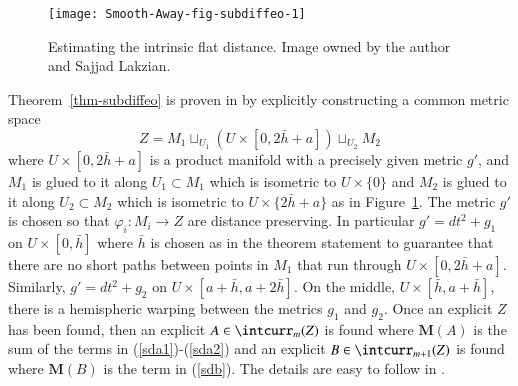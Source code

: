 \documentclass[12pt]{amsart}
\begin{document}
\begin{figure}[htbp]
\begin{center}
\texttt{[image: Smooth-Away-fig-subdiffeo-1]}
\caption{Estimating the intrinsic flat distance.    Image owned by the author
and Sajjad Lakzian.}
\label{fig-LS}
\end{center}
\end{figure}

Theorem~\ref{thm-subdiffeo} is proven in \cite{Lakzian-Sormani}
by explicitly constructing a 
common metric space 
\begin{equation}
Z = M_1{\sqcup}_{U_1}(U\times [0,2\bar{h}+a] ) {\sqcup}_{U_2}M_2
\end{equation}
where $U\times [0,2\bar{h}+a]$ is a product manifold with a precisely given
metric $g'$, and
$M_1$ is glued to it along $U_1\subset M_1$ which is
isometric to $U \times\{0\}$
and  $M_2$ is glued to it along $U_2\subset M_2$ which is
isometric to $U \times\{2\bar{h}+a\}$ as in Figure~\ref{fig-LS}.
The metric $g'$ is chosen so that $\varphi_i: M_i \to Z$
are distance preserving.  In particular $g'=dt^2+ g_1$ on
$U\times [0,\bar{h}]$ where $\bar{h}$ is chosen as in the theorem
statement to guarantee that there are no
short paths between points in $M_1$ that run through $U\times [0,2\bar{h}+a]$.
Similarly, $g'=dt^2+ g_2$ on $U\times [a+\bar{h}, a+2\bar{h}]$.   On the
middle, $U\times [\bar{h}, a+\bar{h}]$, there is a hemispheric warping
between the metrics $g_1$ and $g_2$.   Once an explicit $Z$ has
been found, then an explicit $A\in \intcurr_m(Z)$ is found where
${{\mathbf M}}(A)$ is the sum of the terms in (\ref{sda1})-(\ref{sda2}) and
an explicit $B\in \intcurr_{m+1}(Z)$ is found where ${{\mathbf M}}(B)$ is
the term in (\ref{sdb}).   The details are easy to follow in
\cite{Lakzian-Sormani}.
\end{document}
